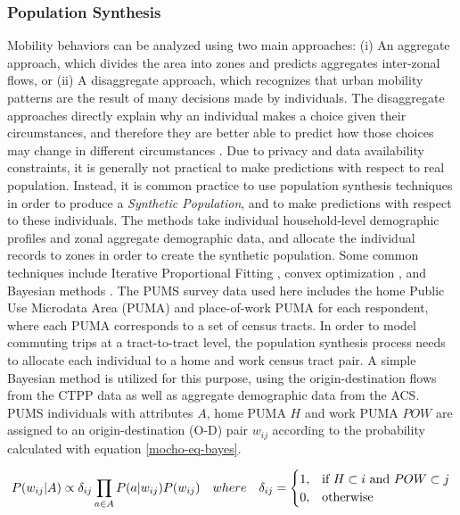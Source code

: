{    \subsubsection{Population Synthesis}
    {
        Mobility behaviors can be analyzed using two main approaches: (i) An aggregate approach, which divides the area into zones and predicts aggregates inter-zonal flows, or (ii) A disaggregate approach, which recognizes that urban mobility patterns are the result of many decisions made by individuals. The disaggregate approaches directly explain why an individual makes a choice given their circumstances, and therefore they are better able to predict how those choices may change in different circumstances \cite{koppelman2006self}. Due to privacy and data availability constraints, it is generally not practical to make predictions with respect to real population. Instead, it is common practice to use population synthesis techniques in order to produce a \textit{Synthetic Population}, and to make predictions with respect to these individuals. The methods take individual household-level demographic profiles and zonal aggregate demographic data, and allocate the individual records to zones in order to create the synthetic population. Some common techniques include Iterative Proportional Fitting \cite{beckman1996creating, guo2007population}, convex optimization \cite{vovsha2015new}, and Bayesian methods \cite{sun2015bayesian}.
        \newline
        The PUMS survey data used here includes the home Public Use Microdata Area (PUMA) and place-of-work PUMA for each respondent, where each PUMA corresponds to a set of census tracts. In order to model commuting trips at a tract-to-tract level, the population synthesis process needs to allocate each individual to a home and work census tract pair. A simple Bayesian method is utilized for this purpose, using the origin-destination flows from the CTPP data as well as aggregate demographic data from the ACS. PUMS individuals with attributes $A$, home PUMA $H$ and work PUMA $POW$ are assigned to an origin-destination (O-D) pair $w_{ij}$ according to the probability calculated with equation \eqref{mocho-eq-bayes}.

        \begin{equation}\label{mocho-eq-bayes}
            P(w_{ij}|A)\propto\delta_{ij}\prod_{a \in A}P(a|w_{ij})P(w_{ij})
            \\
            \quad where
            \\
            \quad
            \delta_{ij}=
            \begin{cases}
                1, & \text{if}\ H\subset i \text{ and } POW\subset j \\
                0, & \text{otherwise}
            \end{cases}
        \end{equation}

}}
